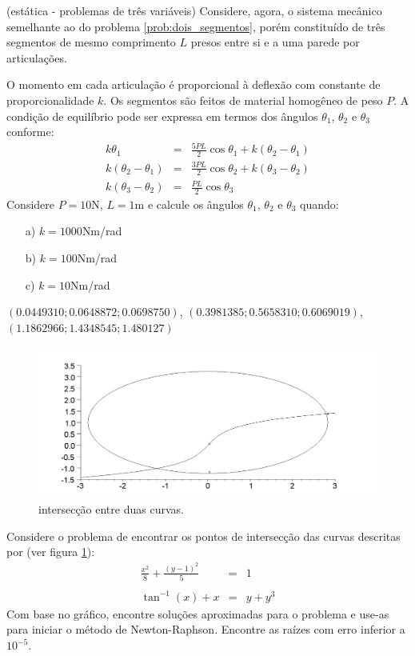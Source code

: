 \begin{exer}{(estática - problemas de três variáveis)} Considere, agora, o sistema mecânico semelhante ao do problema \ref{prob:dois_segmentos}, porém constituído de três segmentos de mesmo comprimento $L$ presos entre si e a uma parede por articulações.

O momento em cada articulação é proporcional à deflexão com constante de proporcionalidade $k$. Os segmentos são feitos de material homogêneo de peso $P$. A condição de equilíbrio pode ser expressa em termos dos ângulos $\theta_1$, $\theta_2$ e $\theta_3$ conforme:
\begin{eqnarray*}
k\theta_1&=& \frac{5PL}{2}\cos\theta_1 + k\left(\theta_2-\theta_1\right)\\
k\left(\theta_2-\theta_1\right)&=& \frac{3PL}{2}\cos\theta_2+k\left(\theta_3-\theta_2\right)\\
k\left(\theta_3-\theta_2\right)&=& \frac{PL}{2}\cos\theta_3
\end{eqnarray*}
Considere $P=10$N, $L=1$m e calcule os ângulos $\theta_1$, $\theta_2$ e $\theta_3$ quando:
\begin{itemize}
\item[a)] $k=1000$Nm/rad
\item[b)] $k=100$Nm/rad
\item[c)] $k=10$Nm/rad
\end{itemize}
\end{exer}
\begin{resp}
$\left(0.0449310; 0.0648872; 0.0698750  \right)$, $\left(0.3981385; 0.5658310; 0.6069019  \right)$, \\
$\left(1.1862966;1.4348545;1.480127  \right)$
\end{resp}


\begin{figure}
        \centering
	    \includegraphics[width=.5\textwidth]{cap_nlinsis/pics/inter_curvas}
		\caption{intersecção entre duas curvas.}
		\label{pic:inter_curvas}
	\end{figure}

\begin{exer}  Considere o problema de encontrar os pontos de intersecção das curvas descritas por (ver figura \ref{pic:inter_curvas}):
\begin{eqnarray*}
\frac{x^2}{8}+\frac{(y-1)^2}{5}&=&1\\~\\
\tan^{-1}(x)+x&=&y+y^3
\end{eqnarray*}
 Com base no gráfico, encontre soluções aproximadas para o problema e use-as para iniciar o método de Newton-Raphson. Encontre as raízes com erro inferior a $10^{-5}$.
\end{exer}

